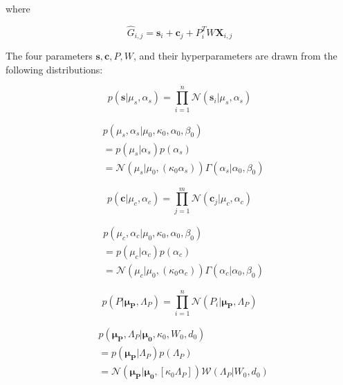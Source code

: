 \documentclass[10pt]{proc}
\begin{document}
where

\begin{equation}
    \hat{G}_{i,j} = \bm{s}_i + \bm{c}_j + P_i^TW\bm{X}_{i,j}
\end{equation}

The four parameters $\bm{s}, \bm{c}, P, W$, and their hyperparameters are drawn
from the following distributions:

\begin{equation}
    p(\bm{s} | \mu_s, \alpha_s) =
        \prod_{i=1}^n \mathcal{N}(\bm{s}_i | \mu_s, \alpha_s)
\end{equation}

\begin{equation}
\begin{aligned}
    &p(\mu_s, \alpha_s | \mu_0, \kappa_0, \alpha_0, \beta_0) \\
        & = p(\mu_s | \alpha_s) p(\alpha_s) \\
        & = \mathcal{N}(\mu_s | \mu_0, (\kappa_0 \alpha_s))
            \Gamma(\alpha_s | \alpha_0, \beta_0)
\end{aligned}
\end{equation}

\begin{equation}
    p(\bm{c} | \mu_c, \alpha_c) =
        \prod_{j=1}^m \mathcal{N}(\bm{c}_j | \mu_c, \alpha_c)
\end{equation}

\begin{equation}
\begin{aligned}
    &p(\mu_c, \alpha_c | \mu_0, \kappa_0, \alpha_0, \beta_0) \\
        & = p(\mu_c | \alpha_c) p (\alpha_c) \\
        & = \mathcal{N}(\mu_c | \mu_0, (\kappa_0 \alpha_c))
            \Gamma(\alpha_c | \alpha_0, \beta_0)
\end{aligned}
\end{equation}

\begin{equation}
    p(P | \bm{\mu_P}, \Lambda_P) =
        \prod_{i=1}^n \mathcal{N}(P_i | \bm{\mu_P}, \Lambda_P)
\end{equation}

\begin{equation}
\begin{aligned}
    &p(\bm{\mu_P}, \Lambda_P | \bm{\mu_0}, \kappa_0, W_0, d_0) \\
        & = p(\bm{\mu_P} | \Lambda_P) p(\Lambda_P) \\
        & = \mathcal{N}(\bm{\mu_P} | \bm{\mu_0}, [\kappa_0 \Lambda_P])
            \mathcal{W}(\Lambda_P | W_0, d_0)
\end{aligned}
\end{equation}
\end{document}
